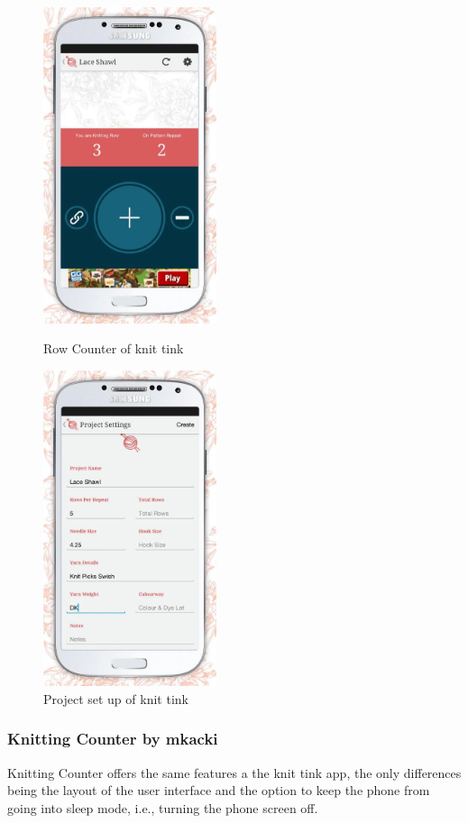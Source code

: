 \documentclass[a4paper,11pt]{kth-mag}
\begin{document}
\begin{figure}[H]
\centering
\begin{minipage}{.5\textwidth}
  \centering
  \includegraphics[width=2in]{images/image10.png}
  \caption{Row Counter of knit tink}
  \label{fig_knittink1}
\end{minipage}%
\begin{minipage}{.5\textwidth}
  \centering
  \includegraphics[width=2in]{images/image11.png}
  \caption{Project set up of knit tink}
  \label{fig_knittink2}
\end{minipage}
\end{figure}

\subsubsection{Knitting Counter by mkacki}
Knitting Counter offers the same features a the knit tink app, the only
differences being the layout of the user interface and the option to keep the
phone from going into sleep mode, i.e., turning the phone screen off.
\end{document}
